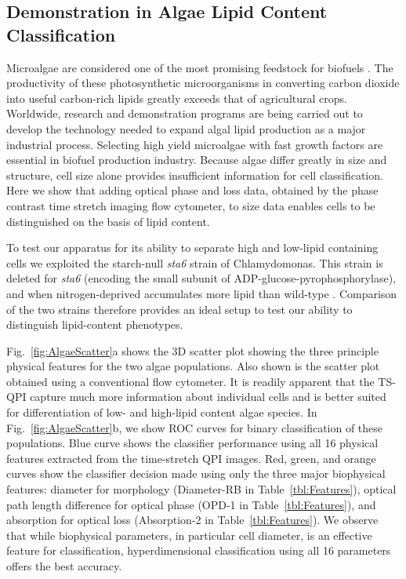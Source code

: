 \documentclass[aps,pra,reprint,superscriptaddress]{revtex4-1}
\begin{document}
\subsection{Demonstration in Algae Lipid Content Classification}

Microalgae are considered one of the most promising feedstock for biofuels \cite{merchant2012tag}. The productivity of these photosynthetic microorganisms in converting carbon dioxide into useful carbon-rich lipids greatly exceeds that of agricultural crops. Worldwide, research and demonstration programs are being carried out to develop the technology needed to expand algal lipid production as a major industrial process. Selecting high yield microalgae with fast growth factors are essential in biofuel production industry. Because algae differ greatly in size and structure, cell size alone provides insufficient information for cell classification. Here we show that adding optical phase and loss data, obtained by the phase contrast time stretch imaging flow cytometer, to size data enables cells to be distinguished on the basis of lipid content. 

To test our apparatus for its ability to separate high and low-lipid containing cells we exploited the starch-null \textit{sta6} strain of Chlamydomonas. This strain is deleted for \textit{sta6} \cite{zabawinski2001starchless} (encoding the small subunit of ADP-glucose-pyrophosphorylase), and when nitrogen-deprived accumulates more lipid than wild-type \cite{work2010increased, li2010chlamydomonas, goodenough2014path, blaby2013systems}. Comparison of the two strains therefore provides an ideal setup to test our ability to distinguish lipid-content phenotypes.

Fig.~\ref{fig:AlgaeScatter}a shows the 3D scatter plot showing the three principle physical features for the two algae populations. Also shown is the scatter plot obtained using a conventional flow cytometer. It is readily apparent that the TS-QPI capture much more information about individual cells and is better suited for differentiation of low- and high-lipid content algae species. In Fig.~\ref{fig:AlgaeScatter}b, we show ROC curves for binary classification of these populations. Blue curve shows the classifier performance using all 16 physical features extracted from the time-stretch QPI images. Red, green, and orange curves show the classifier decision made using only the three major biophysical features: diameter for morphology (Diameter-RB in Table~\ref{tbl:Features}), optical path length difference for optical phase (OPD-1 in Table~\ref{tbl:Features}), and absorption for optical loss (Absorption-2 in Table~\ref{tbl:Features}). We observe that while biophysical parameters, in particular cell diameter, is an effective feature for classification, hyperdimensional classification using all 16 parameters offers the best accuracy. 
\end{document}
